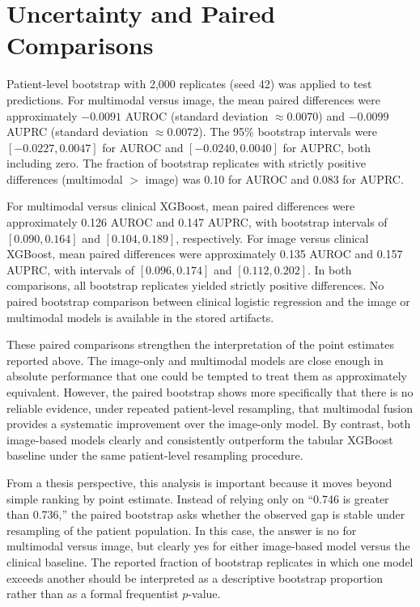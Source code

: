 \section{Uncertainty and Paired Comparisons}

Patient-level bootstrap with 2{,}000 replicates (seed 42) was applied to test predictions. For multimodal versus image, the mean paired differences were approximately $-0.0091$ AUROC (standard deviation $\approx 0.0070$) and $-0.0099$ AUPRC (standard deviation $\approx 0.0072$). The 95\% bootstrap intervals were $[-0.0227, 0.0047]$ for AUROC and $[-0.0240, 0.0040]$ for AUPRC, both including zero. The fraction of bootstrap replicates with strictly positive differences (multimodal $>$ image) was 0.10 for AUROC and 0.083 for AUPRC.

For multimodal versus clinical XGBoost, mean paired differences were approximately 0.126 AUROC and 0.147 AUPRC, with bootstrap intervals of $[0.090, 0.164]$ and $[0.104, 0.189]$, respectively. For image versus clinical XGBoost, mean paired differences were approximately 0.135 AUROC and 0.157 AUPRC, with intervals of $[0.096, 0.174]$ and $[0.112, 0.202]$. In both comparisons, all bootstrap replicates yielded strictly positive differences. No paired bootstrap comparison between clinical logistic regression and the image or multimodal models is available in the stored artifacts.

These paired comparisons strengthen the interpretation of the point estimates reported above. The image-only and multimodal models are close enough in absolute performance that one could be tempted to treat them as approximately equivalent. However, the paired bootstrap shows more specifically that there is no reliable evidence, under repeated patient-level resampling, that multimodal fusion provides a systematic improvement over the image-only model. By contrast, both image-based models clearly and consistently outperform the tabular XGBoost baseline under the same patient-level resampling procedure.

From a thesis perspective, this analysis is important because it moves beyond simple ranking by point estimate. Instead of relying only on ``0.746 is greater than 0.736,'' the paired bootstrap asks whether the observed gap is stable under resampling of the patient population. In this case, the answer is no for multimodal versus image, but clearly yes for either image-based model versus the clinical baseline. The reported fraction of bootstrap replicates in which one model exceeds another should be interpreted as a descriptive bootstrap proportion rather than as a formal frequentist \(p\)-value.

